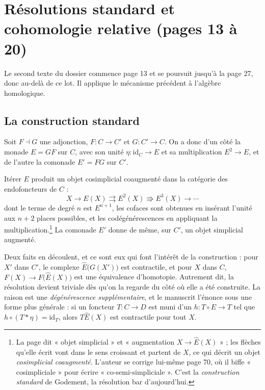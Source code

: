 \documentclass[11pt,a4paper]{article}
\begin{document}
\section*{Résolutions standard et cohomologie relative (pages 13 à 20)}

Le second texte du dossier commence page 13 et se poursuit jusqu'à la page 27,
donc au-delà de ce lot. Il applique le mécanisme précédent à l'algèbre
homologique.

\subsection*{La construction standard}

Soit $F \dashv G$ une adjonction, $F : C \to C'$ et $G : C' \to C$. On a donc
d'un côté la monade $E = GF$ sur $C$, avec son unité
$\eta : \mathrm{id}_{C} \to E$ et sa multiplication $E^{2} \to E$, et de
l'autre la comonade $E' = FG$ sur $C'$.

Itérer $E$ produit un objet cosimplicial coaugmenté dans la catégorie des
endofoncteurs de $C$ :
\[
  X \longrightarrow E(X) \rightrightarrows E^{2}(X)
  \Rrightarrow E^{3}(X) \longrightarrow \cdots
\]
dont le terme de degré $n$ est $E^{n+1}$, les cofaces sont obtenues en
insérant l'unité aux $n+2$ places possibles, et les codégénérescences en
appliquant la multiplication.\footnote{La page dit « objet simplicial » et
« augmentation $X \to \widehat{E}(X)$ » ; les flèches qu'elle écrit vont dans
le sens croissant et partent de $X$, ce qui décrit un objet \emph{cosimplicial
coaugmenté}. L'auteur se corrige lui-même page 70, où il biffe
« cosimpliciale » pour écrire « co-semi-simpliciale ». C'est la
\emph{construction standard} de Godement, la résolution bar d'aujourd'hui.} La
comonade $E'$ donne de même, sur $C'$, un objet simplicial augmenté.

Deux faits en découlent, et ce sont eux qui font l'intérêt de la construction :
pour $X'$ dans $C'$, le complexe $\widehat{E}\bigl( G(X') \bigr)$ est
contractile, et pour $X$ dans $C$, $F(X) \to F\bigl( \widehat{E}(X) \bigr)$ est
une équivalence d'homotopie. Autrement dit, la résolution devient triviale dès
qu'on la regarde du côté où elle a été construite. La raison est une
\emph{dégénérescence supplémentaire}, et le manuscrit l'énonce sous une forme
plus générale : si un foncteur $T : C \to D$ est muni d'un
$h : T \circ E \to T$ tel que $h \circ (T * \eta) = \mathrm{id}_{T}$, alors
$T\widehat{E}(X)$ est contractile pour tout $X$.
\end{document}
